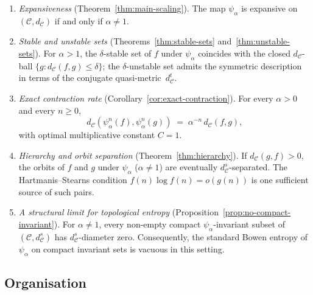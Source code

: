 \documentclass[11pt,a4paper]{article}
\theoremstyle{plain}
\theoremstyle{definition}
\newcommand{\C}{\mathcal{C}}
\begin{document}
\begin{enumerate}[label=\textup{(\arabic*)},leftmargin=2.4em]
\item \emph{Expansiveness} (Theorem~\ref{thm:main-scaling}).
  The map $\psi_\alpha$ is expansive on $(\C,d_\C)$ if and only if
  $\alpha\ne 1$.

\item \emph{Stable and unstable sets}
  (Theorems~\ref{thm:stable-sets} and~\ref{thm:unstable-sets}).
  For $\alpha>1$, the $\delta$-stable set of $f$ under
  $\psi_\alpha$ coincides with the closed $d_\C$-ball
  $\{g:d_\C(f,g)\le\delta\}$; the $\delta$-unstable set admits the
  symmetric description in terms of the conjugate
  quasi-metric~$d_\C^t$.

\item \emph{Exact contraction rate}
  (Corollary~\ref{cor:exact-contraction}). For every $\alpha>0$ and
  every $n\ge 0$,
  \[
    d_\C(\psi_\alpha^n(f),\psi_\alpha^n(g))
    \;=\; \alpha^{-n}\,d_\C(f,g),
  \]
  with optimal multiplicative constant $C=1$.

\item \emph{Hierarchy and orbit separation}
  (Theorem~\ref{thm:hierarchy}). If $d_\C(g,f)>0$, the orbits of
  $f$ and $g$ under $\psi_\alpha$ ($\alpha\ne 1$) are eventually
  $d_\C^s$-separated.  The Hartmanis--Stearns
  condition $f(n)\log f(n)=o(g(n))$ is one sufficient source of
  such pairs.

\item \emph{A structural limit for topological entropy}
  (Proposition~\ref{prop:no-compact-invariant}). For $\alpha\ne 1$,
  every non-empty compact $\psi_\alpha$-invariant subset of
  $(\C,d_\C^s)$ has $d_\C^s$-diameter zero.  Consequently, the
  standard Bowen entropy of $\psi_\alpha$ on compact invariant
  sets is vacuous in this setting.
\end{enumerate}

\subsection{Organisation}
\end{document}
